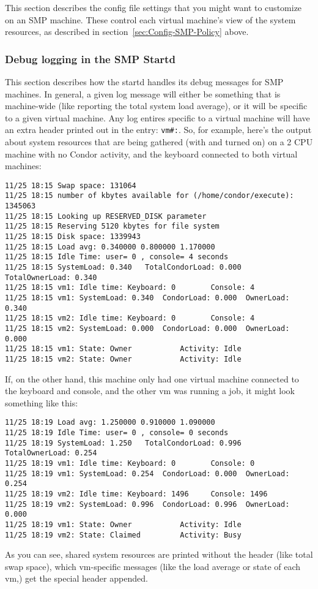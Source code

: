 This section describes the config file settings that you might want to
customize on an SMP machine.  
These control each virtual machine's view of the system resources, as
described in section~\ref{sec:Config-SMP-Policy} above.



\subsubsection{Debug logging in the SMP Startd}
\label{sec:SMP-logging}

This section describes how the startd handles its debug messages for
SMP machines.
In general, a given log message will either be something that is
machine-wide (like reporting the total system load average), or it
will be specific to a given virtual machine.
Any log entires specific to a virtual machine will have an extra
header printed out in the entry: \texttt{vm\#:}.  
So, for example, here's the output about system resources that are
being gathered (with  and  turned on) on
a 2 CPU machine with no Condor activity, and the keyboard connected to
both virtual machines:
\begin{verbatim}
11/25 18:15 Swap space: 131064
11/25 18:15 number of kbytes available for (/home/condor/execute): 1345063
11/25 18:15 Looking up RESERVED_DISK parameter
11/25 18:15 Reserving 5120 kbytes for file system
11/25 18:15 Disk space: 1339943
11/25 18:15 Load avg: 0.340000 0.800000 1.170000
11/25 18:15 Idle Time: user= 0 , console= 4 seconds
11/25 18:15 SystemLoad: 0.340   TotalCondorLoad: 0.000  TotalOwnerLoad: 0.340
11/25 18:15 vm1: Idle time: Keyboard: 0        Console: 4
11/25 18:15 vm1: SystemLoad: 0.340  CondorLoad: 0.000  OwnerLoad: 0.340
11/25 18:15 vm2: Idle time: Keyboard: 0        Console: 4
11/25 18:15 vm2: SystemLoad: 0.000  CondorLoad: 0.000  OwnerLoad: 0.000
11/25 18:15 vm1: State: Owner           Activity: Idle
11/25 18:15 vm2: State: Owner           Activity: Idle
\end{verbatim}

If, on the other hand, this machine only had one virtual machine
connected to the keyboard and console, and the other vm was running a
job, it might look something like this:
\begin{verbatim}
11/25 18:19 Load avg: 1.250000 0.910000 1.090000
11/25 18:19 Idle Time: user= 0 , console= 0 seconds
11/25 18:19 SystemLoad: 1.250   TotalCondorLoad: 0.996  TotalOwnerLoad: 0.254
11/25 18:19 vm1: Idle time: Keyboard: 0        Console: 0
11/25 18:19 vm1: SystemLoad: 0.254  CondorLoad: 0.000  OwnerLoad: 0.254
11/25 18:19 vm2: Idle time: Keyboard: 1496     Console: 1496
11/25 18:19 vm2: SystemLoad: 0.996  CondorLoad: 0.996  OwnerLoad: 0.000
11/25 18:19 vm1: State: Owner           Activity: Idle
11/25 18:19 vm2: State: Claimed         Activity: Busy
\end{verbatim}

As you can see, shared system resources are printed without the header
(like total swap space), which vm-specific messages (like the load
average or state of each vm,) get the special header appended.  
